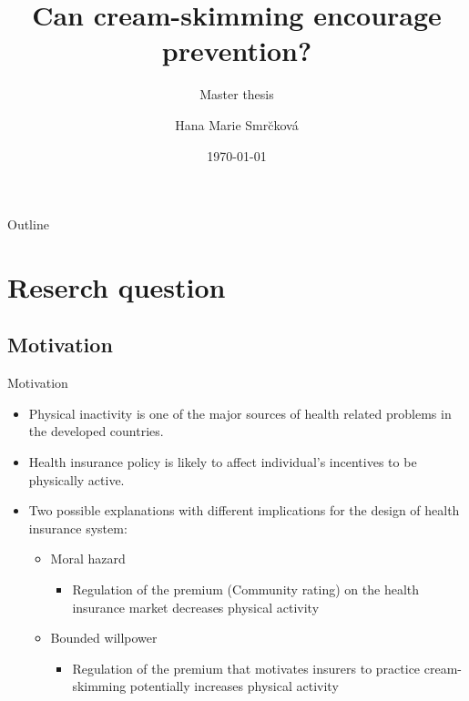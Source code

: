 \documentclass{beamer}
\title[Can cream-skimming encourage prevention?]{Can cream-skimming encourage prevention?}
\subtitle{Master thesis}    %
\author[Hana M. Smr\u{c}kov\'{a}]{Hana Marie Smr\u{c}kov\'{a}}                 %
\institute[TiU]{Tilburg University}      %
\date{\today}      %
\begin{document}
\begin{frame}
  \titlepage
\end{frame}

\section[Outline]{}
\begin{frame}{Outline}
  \tableofcontents
\end{frame}
\section{Reserch question}
\subsection{Motivation}
\begin{frame}{Motivation}
\begin{itemize}
	\item<1-> Physical inactivity is one of the major sources of health related problems in the developed countries.
	\item<2-> Health insurance policy is likely to affect individual's incentives to be physically active.
	\item<3-> Two possible explanations with different implications for the design of health insurance system:
	\begin{itemize}
	\item<4-> Moral hazard
	\begin{itemize}
		\item<4-> Regulation of the premium (Community rating) on the health insurance market decreases physical activity
	\end{itemize}
	\item<5-> Bounded willpower
		\begin{itemize}
			\item<5-> Regulation of the premium that motivates insurers to practice cream-skimming potentially increases physical activity
\end{itemize}
\end{itemize}
\end{itemize}
\end{frame}
\end{document}
